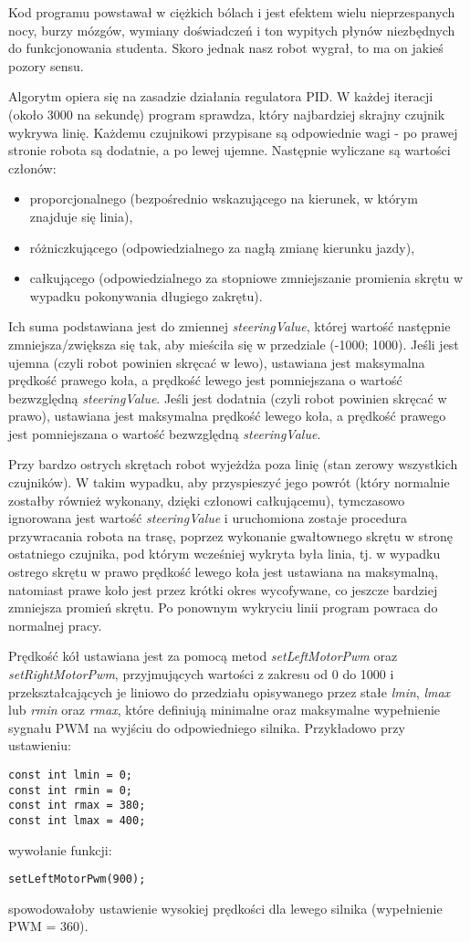 Kod programu powstawał w ciężkich bólach i jest efektem wielu nieprzespanych nocy, burzy mózgów, wymiany doświadczeń i ton wypitych płynów niezbędnych do funkcjonowania studenta. Skoro jednak nasz robot wygrał, to ma on jakieś pozory sensu.

Algorytm opiera się na zasadzie działania regulatora PID. W każdej iteracji (około 3000 na sekundę) program sprawdza, który najbardziej skrajny czujnik wykrywa linię. Każdemu czujnikowi przypisane są odpowiednie wagi - po prawej stronie robota są dodatnie, a po lewej ujemne.
Następnie wyliczane są wartości członów: 
\begin{itemize}
\item proporcjonalnego (bezpośrednio wskazującego na kierunek, w którym znajduje się linia),
\item różniczkującego (odpowiedzialnego za nagłą zmianę kierunku jazdy),
\item całkującego (odpowiedzialnego za stopniowe zmniejszanie promienia skrętu w wypadku pokonywania długiego zakrętu).
\end{itemize}

Ich suma podstawiana jest do zmiennej \emph{steeringValue},  której wartość następnie zmniejsza/zwiększa się tak, aby mieściła się w przedziale (-1000; 1000).
Jeśli jest ujemna (czyli robot powinien skręcać w lewo), ustawiana jest maksymalna prędkość prawego koła, a prędkość lewego jest pomniejszana o wartość bezwzględną \emph{steeringValue}. 
Jeśli jest dodatnia (czyli robot powinien skręcać w prawo), ustawiana jest maksymalna prędkość lewego koła, a prędkość prawego jest pomniejszana o wartość bezwzględną \emph{steeringValue}.

Przy bardzo ostrych skrętach robot wyjeżdża poza linię (stan zerowy wszystkich czujników). W takim wypadku, aby przyspieszyć jego powrót (który normalnie zostałby również wykonany, dzięki członowi całkującemu), tymczasowo ignorowana jest wartość \emph{steeringValue} i uruchomiona zostaje procedura przywracania robota na trasę, poprzez wykonanie gwałtownego skrętu w stronę ostatniego czujnika, pod którym wcześniej wykryta była linia, tj. w wypadku ostrego skrętu w prawo prędkość lewego koła jest ustawiana na maksymalną, natomiast prawe koło jest przez krótki okres wycofywane, co jeszcze bardziej zmniejsza promień skrętu. Po ponownym wykryciu linii program powraca do normalnej pracy.

Prędkość kół ustawiana jest za pomocą metod \emph{setLeftMotorPwm} oraz \emph{setRightMotorPwm}, przyjmujących wartości z zakresu od 0 do 1000 i przekształcających je liniowo do przedziału opisywanego przez stałe \emph{lmin}, \emph{lmax} lub \emph{rmin} oraz \emph{rmax}, które definiują minimalne oraz maksymalne wypełnienie sygnału PWM na wyjściu do odpowiedniego silnika. Przykładowo przy ustawieniu:

\begin{lstlisting}
const int lmin = 0;
const int rmin = 0;
const int rmax = 380;
const int lmax = 400;
\end{lstlisting}
wywołanie funkcji:
\begin{lstlisting}
setLeftMotorPwm(900);
\end{lstlisting}
spowodowałoby ustawienie wysokiej prędkości dla lewego silnika (wypełnienie PWM = 360).
